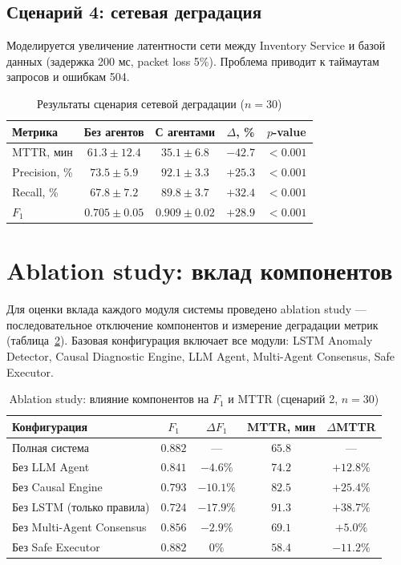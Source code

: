\subsection{Сценарий 4: сетевая деградация}

Моделируется увеличение латентности сети между Inventory Service и базой данных (задержка 200 мс, packet loss 5\%). Проблема приводит к таймаутам запросов и ошибкам 504.

\begin{table}[H]
\centering
\caption{Результаты сценария сетевой деградации ($n = 30$)}
\label{tab:scenario4_results}
\begin{tabular}{|l|c|c|c|c|}
\hline
\textbf{Метрика} & \textbf{Без агентов} & \textbf{С агентами} & \textbf{$\Delta$, \%} & \textbf{$p$-value} \\
\hline
MTTR, мин & $61.3 \pm 12.4$ & $35.1 \pm 6.8$ & $-42.7$ & $< 0.001$ \\
\hline
Precision, \% & $73.5 \pm 5.9$ & $92.1 \pm 3.3$ & $+25.3$ & $< 0.001$ \\
\hline
Recall, \% & $67.8 \pm 7.2$ & $89.8 \pm 3.7$ & $+32.4$ & $< 0.001$ \\
\hline
$F_1$ & $0.705 \pm 0.05$ & $0.909 \pm 0.02$ & $+28.9$ & $< 0.001$ \\
\hline
\end{tabular}
\end{table}

\section{Ablation study: вклад компонентов}

Для оценки вклада каждого модуля системы проведено ablation study --- последовательное отключение компонентов и измерение деградации метрик (таблица~\ref{tab:ablation_study}). Базовая конфигурация включает все модули: LSTM Anomaly Detector, Causal Diagnostic Engine, LLM Agent, Multi-Agent Consensus, Safe Executor.

\begin{table}[H]
\centering
\caption{Ablation study: влияние компонентов на $F_1$ и MTTR (сценарий 2, $n = 30$)}
\label{tab:ablation_study}
\begin{tabular}{|p{5cm}|c|c|c|c|}
\hline
\textbf{Конфигурация} & \textbf{$F_1$} & \textbf{$\Delta F_1$} & \textbf{MTTR, мин} & \textbf{$\Delta$MTTR} \\
\hline
Полная система & $0.882$ & --- & $65.8$ & --- \\
\hline
Без LLM Agent & $0.841$ & $-4.6\%$ & $74.2$ & $+12.8\%$ \\
\hline
Без Causal Engine & $0.793$ & $-10.1\%$ & $82.5$ & $+25.4\%$ \\
\hline
Без LSTM (только правила) & $0.724$ & $-17.9\%$ & $91.3$ & $+38.7\%$ \\
\hline
Без Multi-Agent Consensus & $0.856$ & $-2.9\%$ & $69.1$ & $+5.0\%$ \\
\hline
Без Safe Executor & $0.882$ & $0\%$ & $58.4$ & $-11.2\%$ \\
\hline
\end{tabular}
\end{table}

